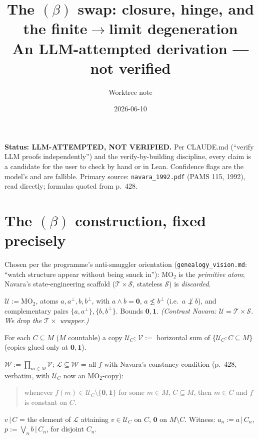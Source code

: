 \documentclass[11pt]{article}
\title{The $(\beta)$ swap: closure, hinge, and the finite$\to$limit
degeneration\\[2pt]
\large An LLM-attempted derivation --- \textbf{not verified}}
\author{Worktree note}
\date{2026-06-10}
\newcommand{\MOtwo}{\mathrm{MO}_2}
\newcommand{\Ucal}{\mathcal{U}}
\newcommand{\Vcal}{\mathcal{V}}
\newcommand{\Wcal}{\mathcal{W}}
\newcommand{\Lcal}{\mathcal{L}}
\newcommand{\Scal}{\mathcal{S}}
\newcommand{\Tcal}{\mathcal{T}}
\begin{document}
\maketitle

\begin{verify}
\noindent\textbf{Status: LLM-ATTEMPTED, NOT VERIFIED.} Per CLAUDE.md
(``verify LLM proofs independently'') and the verify-by-building discipline,
every claim is a candidate for the user to check by hand or in Lean.
Confidence flags are the model's and are fallible. Primary source:
\texttt{navara\_1992.pdf} (PAMS 115, 1992), read directly; formulas quoted
from p.~428.
\end{verify}

\section{The $(\beta)$ construction, fixed precisely}

Chosen per the programme's anti-smuggler orientation
(\texttt{genealogy\_vision.md}: ``watch structure appear without being snuck
in''): $\MOtwo$ is the \emph{primitive atom}; Navara's state-engineering
scaffold ($\Tcal\times\Scal$, stateless $\Scal$) is \emph{discarded}.

\begin{description}[leftmargin=1.4em,itemsep=2pt]
  \item[Block.] $\Ucal := \MOtwo$, atoms $a,a^\perp,b,b^\perp$, with
    $a\wedge b=\mathbf 0$, $a\not\le b^\perp$ (i.e.\ $a\not\perp b$), and
    complementary pairs $\{a,a^\perp\},\{b,b^\perp\}$. Bounds $\mathbf 0,
    \mathbf 1$. \emph{(Contrast Navara: $\Ucal=\Tcal\times\Scal$. We drop the
    $\Tcal\times$ wrapper.)}
  \item[Copies + horizontal sum.] For each $C\subseteq M$ ($M$ countable) a
    copy $\Ucal_C$; $\Vcal :=$ horizontal sum of $\{\Ucal_C:C\subseteq M\}$
    (copies glued only at $\mathbf 0,\mathbf 1$).
  \item[Product + constancy.] $\Wcal := \prod_{m\in M}\Vcal$; $\Lcal\subseteq
    \Wcal$ = all $f$ with Navara's constancy condition (p.~428, verbatim, with
    $\Ucal_C$ now an $\MOtwo$-copy):
    \begin{quote}
    whenever $f(m)\in\Ucal_C\setminus\{\mathbf 0,\mathbf 1\}$ for some
    $m\in M$, $C\subseteq M$, then $m\in C$ and $f$ is constant on $C$.
    \end{quote}
  \item[Notation.] $v\,|\,C$ = the element of $\Lcal$ attaining $v\in\Ucal_C$
    on $C$, $\mathbf 0$ on $M\setminus C$. Witness: $a_n:=a\,|\,C_n$,
    $p:=\bigvee_n b\,|\,C_n$, for disjoint $C_n$.
\end{description}
\end{document}
